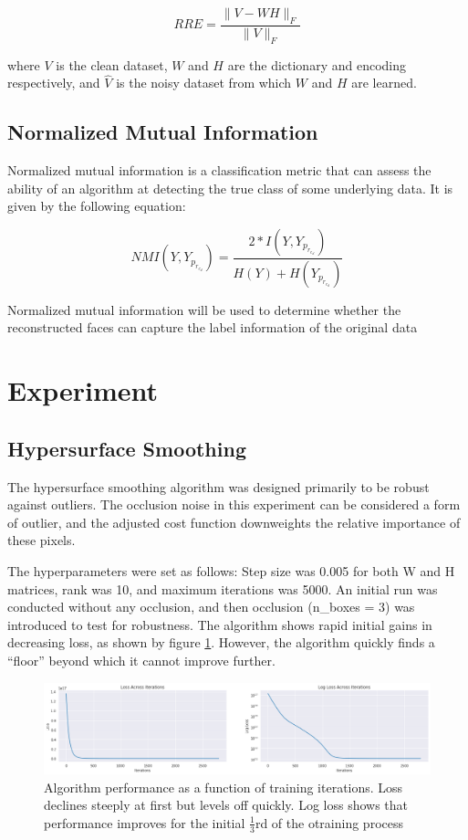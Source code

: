 \documentclass{article} %
\begin{document}
\[RRE = \frac{\|V - WH\|_F}{\|V\|_F}\]

where $V$ is the clean dataset, $W$ and $H$ are the dictionary and encoding respectively, and $\hat{V}$ is the noisy dataset from which $W$ and $H$ are learned.\\

\subsection{Normalized Mutual Information}

Normalized mutual information is a classification metric that can assess the ability of an algorithm at detecting the true class of some underlying data. It is given by the following equation:

\[ NMI(Y,Y_p_r_e_d) =  \frac{2 * I(Y,Y_p_r_e_d)}{H(Y) + H(Y_p_r_e_d)}\]

Normalized mutual information will be used to determine whether the reconstructed faces can capture the label information of the original data


\section{Experiment}

\subsection{Hypersurface Smoothing}

The hypersurface smoothing algorithm was designed primarily to be robust against outliers. The occlusion noise in this experiment can be considered a form of outlier, and the adjusted cost function downweights the relative importance of these pixels.

The hyperparameters were set as follows: Step size was 0.005 for both W and H matrices, rank was 10, and maximum iterations was 5000. An initial run was conducted without any occlusion, and then occlusion (n\_boxes = 3) was introduced to test for robustness. The algorithm shows rapid initial gains in decreasing loss, as shown by figure \ref{figure:hypersurface_logloss}. However, the algorithm quickly finds a ``floor'' beyond which it cannot improve further. 

\begin{figure}[h]
  \includegraphics[width=\textwidth]{hypersurface_logloss}
  \caption{Algorithm performance as a function of training iterations. Loss declines steeply at first but levels off quickly. Log loss shows that performance improves for the initial $\frac{1}{3}$rd of the otraining process}
  \label{figure:hypersurface_logloss}
\end{figure}
\end{document}
